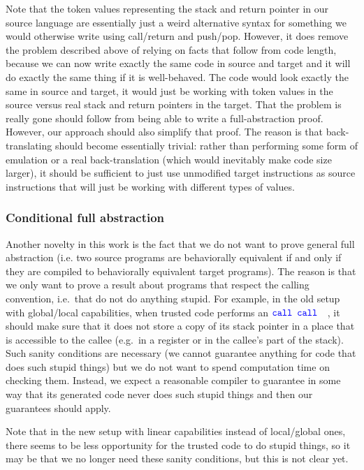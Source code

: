 \documentclass[a3paper]{article}
\newcommand{\sourcecolor}{\color{blue}}
\newcommand{\src}[1]{{\sourcecolor #1}}
\newcommand{\zinstr}[1]{\texttt{#1}}
\newcommand{\scall}[3][]{  
\ifthenelse{\equal{#2#3}{}}
  {\ensuremath{\zinstr{\src{call}}_{#1}}}
  {\ensuremath{\zinstr{\src{call}}_{#1} \; #2 \; #3}}
}
\begin{document}
Note that the token values representing the stack and return pointer in our source language are essentially just a weird alternative syntax for something we would otherwise write using call/return and push/pop.
However, it does remove the problem described above of relying on facts that follow from code length, because we can now write exactly the same code in source and target and it will do exactly the same thing if it is well-behaved.
The code would look exactly the same in source and target, it would just be working with token values in the source versus real stack and return pointers in the target.
That the problem is really gone should follow from being able to write a full-abstraction proof.
However, our approach should also simplify that proof.
The reason is that back-translating should become essentially trivial: rather than performing some form of emulation or a real back-translation (which would inevitably make code size larger), it should be sufficient to just use unmodified target instructions as source instructions that will just be working with different types of values.


\subsubsection{Conditional full abstraction}
\label{sec:conditional-full-abstraction}

Another novelty in this work is the fact that we do not want to prove general full abstraction (i.e. two source programs are behaviorally equivalent if and only if they are compiled to behaviorally equivalent target programs).
The reason is that we only want to prove a result about programs that respect the calling convention, i.e.\ that do not do anything stupid.
For example, in the old setup with global/local capabilities, when trusted code performs an \scall{}{}, it should make sure that it does not store a copy of its stack pointer in a place that is accessible to the callee (e.g.\ in a register or in the callee's part of the stack).
Such sanity conditions are necessary (we cannot guarantee anything for code that does such stupid things) but we do not want to spend computation time on checking them.
Instead, we expect a reasonable compiler to guarantee in some way that its generated code never does such stupid things and then our guarantees should apply.

Note that in the new setup with linear capabilities instead of local/global ones, there seems to be less opportunity for the trusted code to do stupid things, so it may be that we no longer need these sanity conditions, but this is not clear yet.
\end{document}
